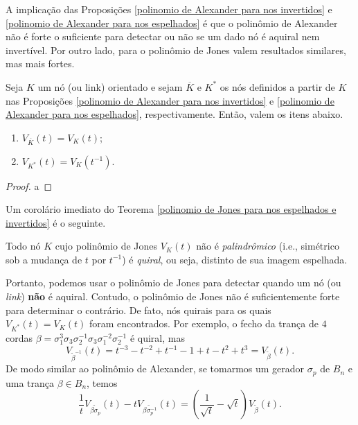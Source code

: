 	A implicação das Proposições \ref{polinomio de Alexander para nos invertidos} 
	e \ref{polinomio de Alexander para nos espelhados} é que o polinômio de Alexander 
	não é forte o suficiente para detectar ou não se um dado nó é aquiral nem invertível. 
	Por outro lado, para o polinômio de Jones valem resultados similares, mas mais fortes.
	\begin{theorem}
	\label{polinomio de Jones para nos espelhados e invertidos}
		Seja $K$ um nó (ou link) orientado e sejam $\overline{K}$ e $K^\ast$ os nós 
		definidos a partir de $K$ nas Proposições \ref{polinomio de Alexander para nos invertidos} 
		e \ref{polinomio de Alexander para nos espelhados}, respectivamente. Então, valem os itens abaixo.
		\begin{enumerate}
			\item $V_{\overline{K}}(t) = V_K(t)$;
			\item $V_{K^\ast}(t) = V_K(t^{-1})$.
		\end{enumerate}
	\end{theorem}
	\begin{proof}
	    a	
	\end{proof}
	Um corolário imediato do Teorema \ref{polinomio de Jones para nos espelhados e invertidos} é o seguinte.
	\begin{corollary}
	\label{simetria polinomio de Jones}
		Todo nó $K$ cujo polinômio de Jones $V_K(t)$ não é \textit{palindrômico} 
		(i.e., simétrico sob a mudança de $t$ por $t^{-1}$) é \textit{quiral}, ou seja, 
		distinto de sua imagem espelhada.
	\end{corollary}
	Portanto, podemos usar o polinômio de Jones para detectar quando um nó (ou \textit{link}) 
	\textbf{não} é aquiral. Contudo, o polinômio de Jones não é suficientemente forte para 
	determinar o contrário. De fato, nós quirais para os quais $V_{K^\ast}(t) = V_K(t)$ foram 
	encontrados. Por exemplo, o fecho da trança de $4$ cordas 
	$\beta = \sigma_1^3\sigma_3\sigma_2^{-1}\sigma_3\sigma_1^{-2}\sigma_2^{-1}$ é quiral, mas 
	\begin{equation*}
	    V_{\widetilde{\beta}^{-1}}(t) = t^{-3} - t^{-2} + t^{-1} - 1 + t - t^2 + t^3 = V_{\widetilde{\beta}}(t).
	\end{equation*}
	De modo similar ao polinômio de Alexander, se tomarmos um gerador $\sigma_p$ de $B_n$ e uma 
	trança $\beta\in B_n$, temos
	\begin{equation*}
	    \frac{1}{t}V_{\widetilde{\beta\sigma_p}}(t) - tV_{\widetilde{\beta\sigma_p^{-1}}}(t) 
	    = \left( \frac{1}{\sqrt{t}} - \sqrt{t}\right)V_{\widetilde{\beta}}(t).
	\end{equation*}
